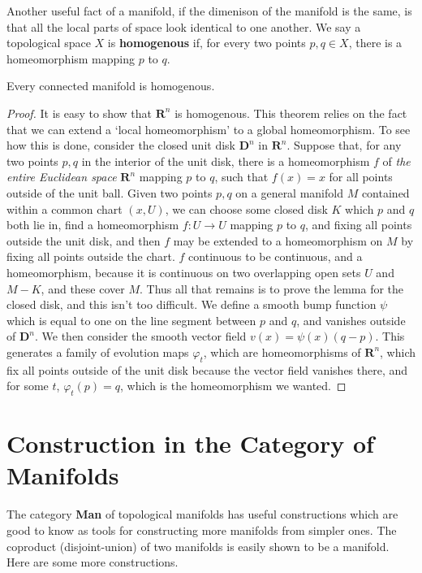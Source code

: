 Another useful fact of a manifold, if the dimenison of the manifold is the same, is that all the local parts of space look identical to one another. We say a topological space $X$ is {\bf homogenous} if, for every two points $p,q \in X$, there is a homeomorphism mapping $p$ to $q$.

\begin{theorem}
    Every connected manifold is homogenous.
\end{theorem}
\begin{proof}
    It is easy to show that $\mathbf{R}^n$ is homogenous. This theorem relies on the fact that we can extend a `local homeomorphism' to a global homeomorphism. To see how this is done, consider the closed unit disk $\mathbf{D}^n$ in $\mathbf{R}^n$. Suppose that, for any two points $p,q$ in the interior of the unit disk, there is a homeomorphism $f$ of {\it the entire Euclidean space} $\mathbf{R}^n$ mapping $p$ to $q$, such that $f(x) = x$ for all points outside of the unit ball. Given two points $p,q$ on a general manifold $M$ contained within a common chart $(x,U)$, we can choose some closed disk $K$ which $p$ and $q$ both lie in, find a homeomorphism $f: U \to U$ mapping $p$ to $q$, and fixing all points outside the unit disk, and then $f$ may be extended to a homeomorphism on $M$ by fixing all points outside the chart. $f$ continuous to be continuous, and a homeomorphism, because it is continuous on two overlapping open sets $U$ and $M - K$, and these cover $M$. Thus all that remains is to prove the lemma for the closed disk, and this isn't too difficult. We define a smooth bump function $\psi$ which is equal to one on the line segment between $p$ and $q$, and vanishes outside of $\mathbf{D}^n$. We then consider the smooth vector field $v(x) = \psi(x)(q - p)$. This generates a family of evolution maps $\varphi_t$, which are homeomorphisms of $\mathbf{R}^n$, which fix all points outside of the unit disk because the vector field vanishes there, and for some $t$, $\varphi_t(p) = q$, which is the homeomorphism we wanted.
\end{proof}

\section{Construction in the Category of Manifolds}

The category {\bf Man} of topological manifolds has useful constructions which are good to know as tools for constructing more manifolds from simpler ones. The coproduct (disjoint-union) of two manifolds is easily shown to be a manifold. Here are some more constructions.

